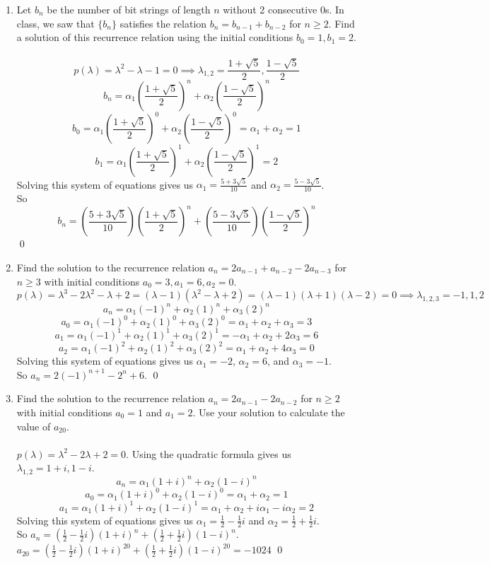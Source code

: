 \documentclass[12pt]{article}
\begin{document}
\begin{enumerate}
\medskip 

\item Let $b_n$ be the number of bit strings of length $n$ without 2 consecutive 0s. In class, we saw that $\{b_n\}$ satisfies the relation $b_n = b_{n-1} + b_{n-2}$ for $n \geq 2$. Find a solution of this recurrence relation using the initial conditions $b_0 = 1, b_1 = 2$.\\\\
\[p(\lambda) = \lambda^2 -\lambda -1 = 0 \implies \lambda_{1,2} = \frac{1+\sqrt{5}}{2},\frac{1-\sqrt{5}}{2}\]
\[b_n=\alpha_1(\frac{1+\sqrt{5}}{2})^n+\alpha_2(\frac{1-\sqrt{5}}{2})^n\]
\[b_0=\alpha_1(\frac{1+\sqrt{5}}{2})^0+\alpha_2(\frac{1-\sqrt{5}}{2})^0=\alpha_1+\alpha_2 =1\]
\[b_1=\alpha_1(\frac{1+\sqrt{5}}{2})^1+\alpha_2(\frac{1-\sqrt{5}}{2})^1=2\]
Solving this system of equations gives us $\alpha_1 = \frac{5+3\sqrt{5}}{10}$ and $\alpha_2 = \frac{5-3\sqrt{5}}{10}$.\\
So \[b_n=(\frac{5+3\sqrt{5}}{10})(\frac{1+\sqrt{5}}{2})^n+(\frac{5-3\sqrt{5}}{10})(\frac{1-\sqrt{5}}{2})^n\]\qed



\medskip
\item Find the solution to the recurrence relation $a_n = 2a_{n-1} + a_{n-2} -2a_{n-3}$ for $n \geq 3$ with initial conditions $a_0 = 3, a_1=6, a_2 = 0$.
\[p(\lambda) = \lambda^3 -2\lambda^2-\lambda+2 = (\lambda-1)(\lambda^2-\lambda+2) = (\lambda-1)(\lambda+1)(\lambda-2) = 0 \implies \lambda_{1,2,3} = -1,1,2\]
\[a_n=\alpha_1(-1)^n+\alpha_2(1)^n+\alpha_3(2)^n\]
\[a_0=\alpha_1(-1)^0+\alpha_2(1)^0+\alpha_3(2)^0 = \alpha_1+\alpha_2+\alpha_3 = 3\]
\[a_1=\alpha_1(-1)^1+\alpha_2(1)^1+\alpha_3(2)^1 = -\alpha_1+\alpha_2+2\alpha_3 = 6\]
\[a_2=\alpha_1(-1)^2+\alpha_2(1)^2+\alpha_3(2)^2 = \alpha_1+\alpha_2+4\alpha_3 = 0\]
Solving this system of equations gives us $\alpha_1 = -2$, $\alpha_2 = 6$, and $\alpha_3 = -1$.\\
So $a_n = 2(-1)^{n+1}-2^n+6$. \qed
 

\medskip 

\item Find the solution to the recurrence relation $a_n = 2a_{n-1} -2a_{n-2}$ for $n \geq 2$ with initial conditions $a_0=1$ and $a_1 = 2$. Use your solution to calculate the value of $a_{20}$.\\\\
$p(\lambda) = \lambda^2 - 2\lambda + 2 = 0$. Using the quadratic formula gives us $\lambda_{1,2} = 1+i,1-i$. 
\[a_n = \alpha_1(1+i)^n+\alpha_2(1-i)^n\]
\[a_0 = \alpha_1(1+i)^0+\alpha_2(1-i)^0 = \alpha_1+\alpha_2 = 1\]
\[a_1 = \alpha_1(1+i)^1+\alpha_2(1-i)^1 = \alpha_1+\alpha_2 +i\alpha_1-i\alpha_2 = 2\]
Solving this system of equations gives us $\alpha_1 = \frac{1}{2}-\frac{1}{2}i$ and $\alpha_2 = \frac{1}{2}+\frac{1}{2}i$.\\
So $a_n = (\frac{1}{2}-\frac{1}{2}i)(1+i)^n + (\frac{1}{2}+\frac{1}{2}i)(1-i)^n$.\\
$a_{20} = (\frac{1}{2}-\frac{1}{2}i)(1+i)^{20} + (\frac{1}{2}+\frac{1}{2}i)(1-i)^{20} = -1024$ \qed
\medskip



\end{enumerate}
\end{document}
